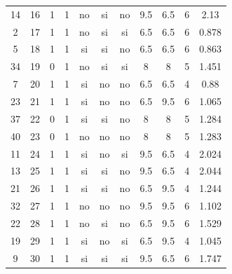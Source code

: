 \documentclass[12pt,a4paper,twoside,openright,titlepage,final]{article}
\begin{document}
\begin{appendices}
\begin{landscape}
\begin{center}
\begin{longtable}{@{\extracolsep{\fill}}*{11}{c}}
					14       & 16           & 1         & 1       & no   & si        & no           & 9.5        & 6.5           & 6             & 2.13   \\
					2        & 17           & 1         & 1       & no   & si        & si           & 6.5        & 6.5           & 6             & 0.878  \\
					5        & 18           & 1         & 1       & si   & si        & no           & 6.5        & 6.5           & 6             & 0.863  \\
					34       & 19           & 0         & 1       & no   & si        & si           & 8          & 8             & 5             & 1.451  \\
					7        & 20           & 1         & 1       & si   & no        & no           & 6.5        & 6.5           & 4             & 0.88   \\
					23       & 21           & 1         & 1       & si   & no        & no           & 6.5        & 9.5           & 6             & 1.065  \\
					37       & 22           & 0         & 1       & si   & si        & no           & 8          & 8             & 5             & 1.284  \\
					40       & 23           & 0         & 1       & no   & no        & no           & 8          & 8             & 5             & 1.283  \\
					11       & 24           & 1         & 1       & si   & no        & si           & 9.5        & 6.5           & 4             & 2.024  \\
					13       & 25           & 1         & 1       & si   & si        & no           & 9.5        & 6.5           & 4             & 2.044  \\
					21       & 26           & 1         & 1       & si   & si        & no           & 6.5        & 9.5           & 4             & 1.244  \\
					32       & 27           & 1         & 1       & no   & no        & no           & 9.5        & 9.5           & 6             & 1.102  \\
					22       & 28           & 1         & 1       & no   & si        & no           & 6.5        & 9.5           & 6             & 1.529  \\
					19       & 29           & 1         & 1       & si   & no        & si           & 6.5        & 9.5           & 4             & 1.045  \\
					9        & 30           & 1         & 1       & si   & si        & si           & 9.5        & 6.5           & 6             & 1.747  \\

\end{longtable}
\end{center}
\end{landscape}
\end{appendices}
\end{document}
